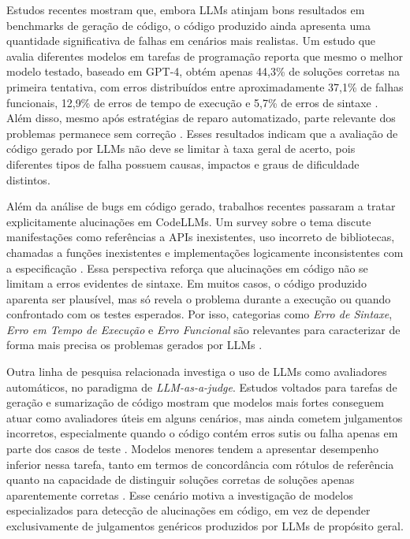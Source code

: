 \documentclass[conference]{IEEEtran}
\begin{document}
Estudos recentes mostram que, embora LLMs atinjam bons resultados em benchmarks de geração de código, o código produzido ainda apresenta uma quantidade significativa de falhas em cenários mais realistas. Um estudo que avalia diferentes modelos em tarefas de programação reporta que mesmo o melhor modelo testado, baseado em GPT-4, obtém apenas 44{,}3\% de soluções corretas na primeira tentativa, com erros distribuídos entre aproximadamente 37{,}1\% de falhas funcionais, 12{,}9\% de erros de tempo de execução e 5{,}7\% de erros de sintaxe \cite{2407.06153}. Além disso, mesmo após estratégias de reparo automatizado, parte relevante dos problemas permanece sem correção \cite{2407.06153}. Esses resultados indicam que a avaliação de código gerado por LLMs não deve se limitar à taxa geral de acerto, pois diferentes tipos de falha possuem causas, impactos e graus de dificuldade distintos.

Além da análise de bugs em código gerado, trabalhos recentes passaram a tratar explicitamente alucinações em CodeLLMs. Um survey sobre o tema discute manifestações como referências a APIs inexistentes, uso incorreto de bibliotecas, chamadas a funções inexistentes e implementações logicamente inconsistentes com a especificação \cite{2504.20799}. Essa perspectiva reforça que alucinações em código não se limitam a erros evidentes de sintaxe. Em muitos casos, o código produzido aparenta ser plausível, mas só revela o problema durante a execução ou quando confrontado com os testes esperados. Por isso, categorias como \emph{Erro de Sintaxe}, \emph{Erro em Tempo de Execução} e \emph{Erro Funcional} são relevantes para caracterizar de forma mais precisa os problemas gerados por LLMs \cite{2504.20799,2404.00971,2405.00253}.

Outra linha de pesquisa relacionada investiga o uso de LLMs como avaliadores automáticos, no paradigma de \emph{LLM-as-a-judge}. Estudos voltados para tarefas de geração e sumarização de código mostram que modelos mais fortes conseguem atuar como avaliadores úteis em alguns cenários, mas ainda cometem julgamentos incorretos, especialmente quando o código contém erros sutis ou falha apenas em parte dos casos de teste \cite{2507.16587}. Modelos menores tendem a apresentar desempenho inferior nessa tarefa, tanto em termos de concordância com rótulos de referência quanto na capacidade de distinguir soluções corretas de soluções apenas aparentemente corretas \cite{2507.16587}. Esse cenário motiva a investigação de modelos especializados para detecção de alucinações em código, em vez de depender exclusivamente de julgamentos genéricos produzidos por LLMs de propósito geral.
\end{document}
